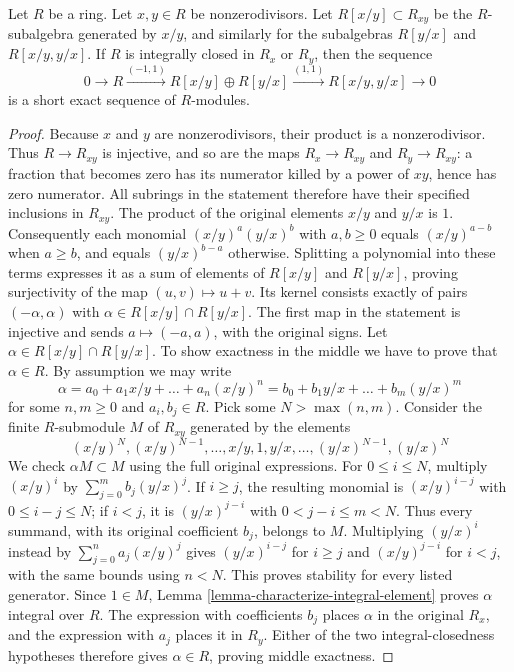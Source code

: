 \begin{lemma}
\label{lemma-silly-normal}
Let $R$ be a ring. Let $x, y \in R$ be nonzerodivisors.
Let $R[x/y] \subset R_{xy}$ be the $R$-subalgebra generated
by $x/y$, and similarly for the subalgebras $R[y/x]$ and $R[x/y, y/x]$.
If $R$ is integrally closed in $R_x$ or $R_y$, then the sequence
$$
0 \to R \xrightarrow{(-1, 1)} R[x/y] \oplus R[y/x] \xrightarrow{(1, 1)}
R[x/y, y/x] \to 0
$$
is a short exact sequence of $R$-modules.
\end{lemma}

\begin{proof}
Because $x$ and $y$ are nonzerodivisors, their product is a
nonzerodivisor. Thus $R\to R_{xy}$ is injective, and so are the
maps $R_x\to R_{xy}$ and $R_y\to R_{xy}$: a fraction that becomes
zero has its numerator killed by a power of $xy$, hence has zero
numerator. All subrings in the statement therefore have their
specified inclusions in $R_{xy}$. The product of the original
elements $x/y$ and $y/x$ is $1$. Consequently each monomial
$(x/y)^a(y/x)^b$ with $a,b\geq0$ equals $(x/y)^{a-b}$ when
$a\geq b$, and equals $(y/x)^{b-a}$ otherwise. Splitting a
polynomial into these terms expresses it as a sum of elements
of $R[x/y]$ and $R[y/x]$, proving surjectivity of the map
$(u,v)\mapsto u+v$. Its kernel consists exactly of pairs
$(-\alpha,\alpha)$ with $\alpha\in R[x/y]\cap R[y/x]$.
The first map in the statement is injective and sends
$a\mapsto(-a,a)$, with the original signs.
Let $\alpha \in R[x/y] \cap R[y/x]$. To show exactness in the middle
we have to prove that $\alpha \in R$. By assumption we may write
$$
\alpha = a_0 + a_1 x/y + \ldots + a_n (x/y)^n =
b_0 + b_1 y/x + \ldots + b_m(y/x)^m
$$
for some $n, m \geq 0$ and $a_i, b_j \in R$.
Pick some $N > \max(n, m)$.
Consider the finite $R$-submodule $M$ of $R_{xy}$ generated by the elements
$$
(x/y)^N, (x/y)^{N - 1}, \ldots, x/y, 1, y/x, \ldots, (y/x)^{N - 1}, (y/x)^N
$$
We check $\alpha M\subset M$ using the full original expressions.
For $0\leq i\leq N$, multiply $(x/y)^i$ by
$\sum_{j=0}^m b_j(y/x)^j$. If $i\geq j$, the resulting
monomial is $(x/y)^{i-j}$ with $0\leq i-j\leq N$; if $i<j$,
it is $(y/x)^{j-i}$ with $0<j-i\leq m<N$.
Thus every summand, with its original coefficient $b_j$, belongs
to $M$. Multiplying $(y/x)^i$ instead by
$\sum_{j=0}^n a_j(x/y)^j$ gives $(y/x)^{i-j}$ for $i\geq j$
and $(x/y)^{j-i}$ for $i<j$, with the same bounds using $n<N$.
This proves stability for every listed generator. Since $1\in M$,
Lemma \ref{lemma-characterize-integral-element} proves $\alpha$
integral over $R$. The expression with coefficients $b_j$ places
$\alpha$ in the original $R_x$, and the expression with $a_j$
places it in $R_y$. Either of the two integral-closedness
hypotheses therefore gives $\alpha\in R$, proving middle exactness.


\end{proof}
